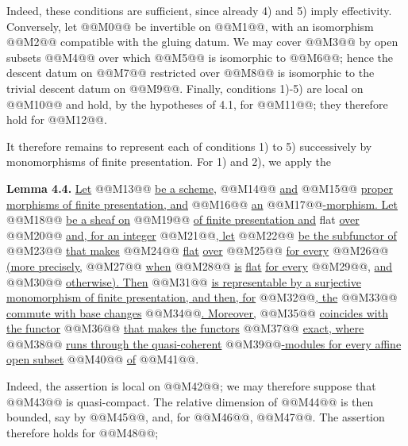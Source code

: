 Indeed, these conditions are sufficient, since already 4) and 5) imply effectivity. Conversely, let @@M0@@ be invertible on @@M1@@, with an isomorphism @@M2@@ compatible with the gluing datum. We may cover @@M3@@ by open subsets @@M4@@ over which @@M5@@ is isomorphic to @@M6@@; hence the descent datum on @@M7@@ restricted over @@M8@@ is isomorphic to the trivial descent datum on @@M9@@. Finally, conditions 1)-5) are local on @@M10@@ and hold, by the hypotheses of 4.1, for @@M11@@; they therefore hold for @@M12@@.

It therefore remains to represent each of conditions 1) to 5) successively by monomorphisms of finite presentation. For 1) and 2), we apply the

\textbf{Lemma 4.4.} \uline{Let} @@M13@@ \uline{be a scheme,} @@M14@@ \uline{and} @@M15@@ \uline{proper morphisms of finite presentation, and} @@M16@@ \uline{an} @@M17@@\uline{-morphism. Let} @@M18@@ \uline{be a sheaf on} @@M19@@ \uline{of finite presentation and} flat \uline{over} @@M20@@ \uline{and, for an integer} @@M21@@\uline{, let} @@M22@@ \uline{be the subfunctor of} @@M23@@ \uline{that makes} @@M24@@ \uline{flat} \uline{over} @@M25@@ \uline{for every} @@M26@@ \uline{(more precisely,} @@M27@@ \uline{when} @@M28@@ \uline{is} \uline{flat} \uline{for every} @@M29@@, \uline{and} @@M30@@ \uline{otherwise). Then} @@M31@@ \uline{is representable by a surjective monomorphism of finite presentation, and then, for} @@M32@@\uline{, the} @@M33@@ \uline{commute with base changes} @@M34@@\uline{. Moreover,} @@M35@@ \uline{coincides with the functor} @@M36@@ \uline{that makes the functors}
@@M37@@
\uline{exact, where} @@M38@@ \uline{runs through the quasi-coherent} @@M39@@\uline{-modules for every affine open subset} @@M40@@ \uline{of} @@M41@@.

Indeed, the assertion is local on @@M42@@; we may therefore suppose that @@M43@@ is quasi-compact. The relative dimension of @@M44@@ is then bounded, say by @@M45@@, and, for @@M46@@, @@M47@@. The assertion therefore holds for @@M48@@;

